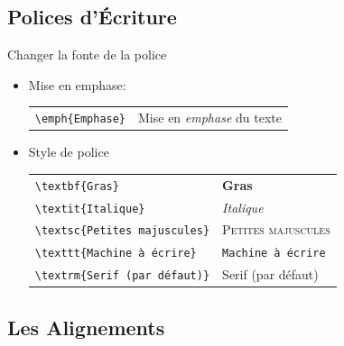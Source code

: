 \subsection{Polices d'Écriture}

\begin{frame}[fragile]{Changer la fonte de la police}
  \begin{itemize}
      \item Mise en emphase:
      \begin{center}
      \begin{tabular}{ll}
      \lstinline|\emph{Emphase}| & Mise en \emph{emphase} du texte
      \end{tabular}
      \end{center}
  \item Style de police
  \begin{center}
  \begin{tabular}{ll}
  \lstinline|\textbf{Gras}| & \textbf{Gras} \\
  \lstinline|\textit{Italique}| & \textsl{Italique} \\
  \lstinline|\textsc{Petites majuscules}| & \textsc{Petites majuscules} \\
  \lstinline|\texttt{Machine à écrire}| & \texttt{Machine à écrire} \\
  \lstinline|\textrm{Serif (par défaut)}| & \textrm{Serif (par défaut)}
  \end{tabular}
  \end{center}
  \end{itemize}
\end{frame}

\subsection{Les Alignements}

